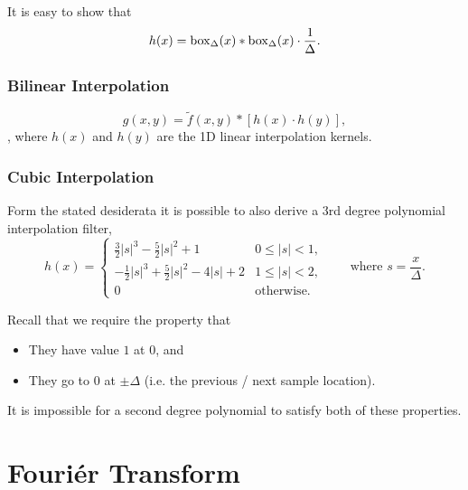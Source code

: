 It is easy to show that \[
    h(x) = \mathrm{box}_{\Delta}(x) \ast \mathrm{box}_{\Delta}(x) \cdot \frac{1}{\Delta}.
\]

\subsubsection{Bilinear Interpolation}


\[
    g(x, y) = \tilde{f}(x, y) \ast \left[ h(x) \cdot h(y) \right],
\], where $h(x)$ and $h(y)$ are the 1D linear interpolation kernels.

\subsubsection{Cubic Interpolation}

Form the stated desiderata it is possible to also derive a 3rd degree polynomial interpolation filter, \[
    h(x) = \begin{cases}
        \frac{3}{2} |s|^3 - \frac{5}{2} |s|^2 + 1 & 0 \le |s| < 1, \\
        -\frac{1}{2} |s|^3 + \frac{5}{2} |s|^2 - 4|s| + 2 & 1 \le |s| < 2, \\
        0 & \text{otherwise}.
    \end{cases} \qquad \text{where } s = \frac{x}{\Delta}.
\]

\begin{remark}
    Recall that we require the property that \begin{itemize}
        \item They have value $1$ at $0$, and 
        \item They go to $0$ at $\pm \Delta$ (i.e. the previous / next sample location).
    \end{itemize}

    It is impossible for a second degree polynomial to satisfy both of these properties.
\end{remark}

\section{Fouriér Transform}